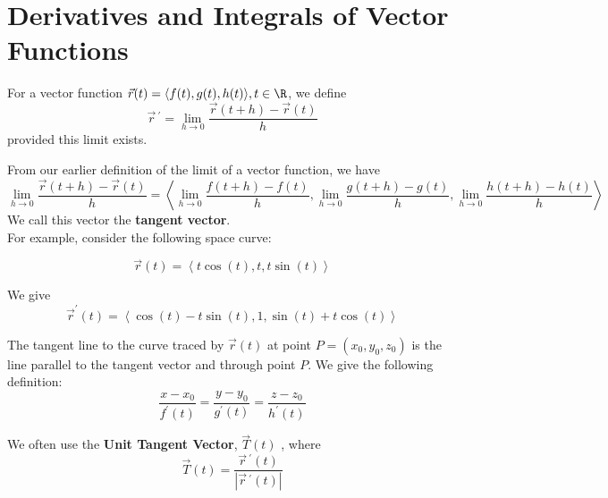\section{Derivatives and Integrals of Vector Functions}
\begin{definition}
    For a vector function \(\vec{r}(t)=\langle f(t),g(t),h(t) \rangle,t\in\R \), we define
    \[
        \vec{r}\,^{\prime} =\lim_{h \to0} \frac{\vec{r}(t+h)-\vec{r}(t)}{h}
    \]
    provided this limit exists.
\end{definition}
From our earlier definition of the limit of a vector function, we have
\[ 
   \lim_{h\to0} \frac{\vec{r}(t+h)-\vec{r}(t)}{h}=\left\langle \lim_{h\to 0}\frac{f(t+h)-f(t)}{h},\lim_{h\to 0}\frac{g(t+h)-g(t)}{h},\lim_{h\to 0}\frac{h(t+h)-h(t)}{h} \right\rangle
\]
We call this vector the \textbf{tangent vector}.\\
For example, consider the following space curve: 
\begin{center}
    \[
        \vec{r}(t)=\left\langle t\cos (t),t,t\sin (t) \right\rangle 
    \]
\end{center}
We give
\[
    \vec{r}^{\prime} (t)=\left\langle \cos (t)-t\sin (t),1,\sin (t)+t\cos (t) \right\rangle 
\]
\begin{definition}
    The tangent line to the curve traced by \(\vec{r}(t)\) at point \(P=(x_0,y_0,z_0)\) is the line parallel to the tangent vector and through point \(P\). We give the following definition: 
    \[
        \frac{x-x_0}{f^{\prime} (t)}=\frac{y-y_0}{g^{\prime} (t)}=\frac{z-z_0}{h^{\prime} (t)}
    \]
\end{definition}
\begin{definition}
    We often use the \textbf{Unit Tangent Vector}, \(\vec{T}(t)\) , where
    \[
        \vec{T}(t)=\frac{\vec{r}\,^{\prime} (t)}{|\vec{r}\,^{\prime} (t)|}
    \]
\end{definition}
